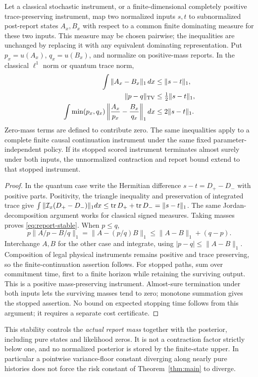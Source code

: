 \begin{proposition}\label{prop:instrument}
Let a classical stochastic instrument, or a finite-dimensional completely positive trace-preserving instrument, map two normalized inputs $s,t$ to subnormalized post-report states $A_x,B_x$ with respect to a common finite dominating measure for these two inputs. This measure may be chosen pairwise; the inequalities are unchanged by replacing it with any equivalent dominating representation. Put $p_x=u(A_x)$, $q_x=u(B_x)$, and normalize on positive-mass reports. In the classical $\ell^1$ norm or quantum trace norm,
\begin{align}
 \int\|A_x-B_x\|_1\,dx&\le\|s-t\|_1,\label{eq:unnorm-stable}\\
 \|p-q\|_{\mathrm{TV}}&\le\tfrac12\|s-t\|_1,\label{eq:report-stable}\\
 \int\min(p_x,q_x)\left\|\frac{A_x}{p_x}-\frac{B_x}{q_x}\right\|_1dx
 &\le2\|s-t\|_1.\label{eq:weighted-stable}
\end{align}
Zero-mass terms are defined to contribute zero. The same inequalities apply to a complete finite causal continuation instrument under the same fixed parameter-independent policy. If its stopped scored instrument terminates almost surely under both inputs, the unnormalized contraction and report bound extend to that stopped instrument.
\end{proposition}
\begin{proof}
In the quantum case write the Hermitian difference $s-t=D_+-D_-$ with positive parts. Positivity, the triangle inequality and preservation of integrated trace give
$\int\|\mathcal I_x(D_+-D_-)\|_1dx\le\operatorname{tr} D_++\operatorname{tr} D_-=\|s-t\|_1$.
The same Jordan-decomposition argument works for classical signed measures. Taking masses proves \eqref{eq:report-stable}. When $p\le q$,
\[
 p\|A/p-B/q\|_1=\|A-(p/q)B\|_1
 \le\|A-B\|_1+(q-p).
\]
Interchange $A,B$ for the other case and integrate, using $|p-q|\le\|A-B\|_1$. Composition of legal physical instruments remains positive and trace preserving, so the finite-continuation assertion follows. For stopped paths, sum over commitment time, first to a finite horizon while retaining the surviving output. This is a positive mass-preserving instrument. Almost-sure termination under both inputs lets the surviving masses tend to zero; monotone summation gives the stopped assertion. No bound on expected stopping time follows from this argument; it requires a separate cost certificate.
\end{proof}

This stability controls the \emph{actual report mass} together with the posterior, including pure states and likelihood zeros. It is not a contraction factor strictly below one, and no normalized posterior is stored by the finite-state upper. In particular a pointwise variance-floor constant diverging along nearly pure histories does not force the risk constant of Theorem~\ref{thm:main} to diverge.
